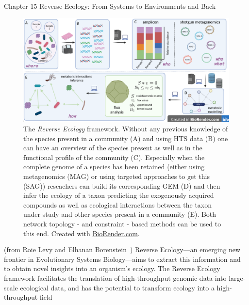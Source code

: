       Chapter 15
      Reverse Ecology: From Systems
      to Environments and Back

      \begin{figure}[!h]
         \centering
         \includegraphics[width=135mm]{figures/reverse_ecology.png}
         \caption[The \textit{Reverse Ecology} framework.]{The \textit{Reverse Ecology} framework. Without any previous knowledge of the species present in a community (A) and using HTS data (B) one can have an overview of the species present 
         as well as in the functional profile of the community (C).
         Especially when the complete genome of a species has been retained (either using 
         metagenomics (MAG) or using targeted approaches to get this (SAG))
         reseachers can build its corresponding GEM (D) and then 
         infer the ecology of a taxon predicting 
         the exogenously acquired compounds as well as ecological interactions between the taxon under study and other species present in a community (E). 
         Both network topology - and constraint - based methods can be used to this end.
         Created with \href{BioRender.com}{BioRender.com}.
         }
         \label{fig:revecol}
      \end{figure}


      (from Roie Levy and Elhanan Borenstein~\cite{levy2012reverse})
      Reverse Ecology—an emerging new frontier in Evolutionary Systems Biology—aims
      to extract this information and to obtain novel insights into an organism’s ecology.
      The Reverse Ecology framework facilitates the translation of high-throughput
      genomic data into large-scale ecological data, and has the potential to transform
      ecology into a high-throughput field


